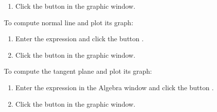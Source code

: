 \begin{enumerate}[leftmargin=*]
\begin{indication}
\begin{enumerate}
\item Click the button  in the graphic window.
\end{enumerate}
To compute normal line and plot its graph:
\begin{enumerate}[resume]
\item Enter the expression  and click the button .
\item Click the button  in the graphic window.
\end{enumerate}
To compute the tangent plane and plot its graph:
\begin{enumerate}[resume]
\item Enter the expression  in the Algebra window and click the button .
\item Click the button  in the graphic window.
\end{enumerate}
\end{indication}
% 

\end{enumerate}
